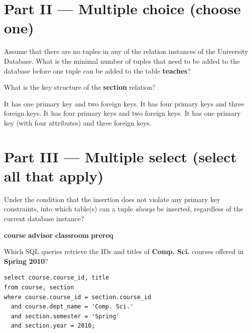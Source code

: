 \documentclass[12pt]{exam}
\begin{document}
\begin{questions}
{}


\section*{Part II — Multiple choice (choose one)}
\question[2] Assume that there are no tuples in any of the relation instances of the University Database. 
What is the minimal number of tuples that need to be added to the database before one tuple can be added 
to the table \textbf{teaches}?
\begin{choices}
\end{choices}

\question[3] What is the key structure of the \textbf{section} relation?
\begin{choices}
  \CorrectChoice It has one primary key and two foreign keys.
  \choice It has four primary keys and three foreign keys.
  \choice It has four primary keys and two foreign keys.
  \choice It has one primary key (with four attributes) and three foreign keys.
\end{choices}

\section*{Part III — Multiple select (select all that apply)}
\question[4] Under the condition that the insertion does not violate any primary key constraints, into which table(s) can a tuple \emph{always} be inserted, regardless of the current database instance?
\begin{checkboxes}
  \CorrectChoice \textbf{course}
  \choice \textbf{advisor}
  \CorrectChoice \textbf{classroom}
  \choice \textbf{prereq}
\end{checkboxes}


\question[4] Which SQL queries retrieve the IDs and titles of \textbf{Comp. Sci.} courses offered in \textbf{Spring 2010}?
\begin{checkboxes}

  \CorrectChoice
\begin{verbatim}
select course.course_id, title
from course, section
where course.course_id = section.course_id
  and course.dept_name = 'Comp. Sci.'
  and section.semester = 'Spring'
  and section.year = 2010;
\end{verbatim}


\end{checkboxes}
\end{questions}
\end{document}
